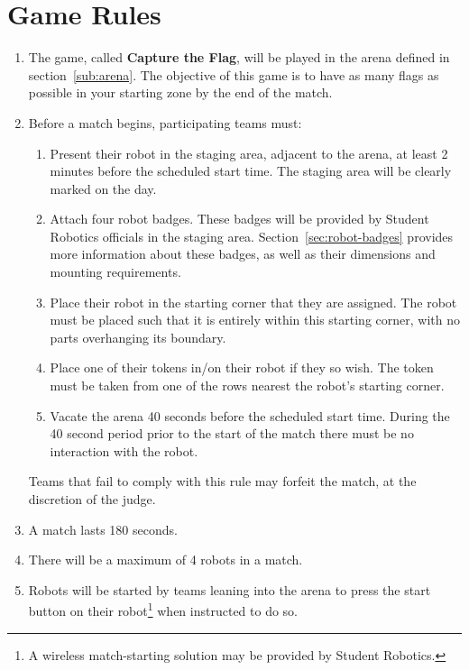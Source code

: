 \section {Game Rules}
\label{game-rules}

\begin{enumerate}
\item The game, called \textbf{Capture the Flag}, will be played in the arena defined in section~\ref{sub:arena}.
      The objective of this game is to have as many flags as possible in your starting zone by the end of the match.

\item Before a match begins, participating teams must:
\begin {enumerate}
  \item Present their robot in the staging area, adjacent to the arena, at least 2 minutes before the scheduled start time.
        The staging area will be clearly marked on the day.

  \item Attach four robot badges.
        These badges will be provided by Student Robotics officials in the staging area.
        Section~\ref{sec:robot-badges} provides more information about these badges, as well as their dimensions and mounting requirements.

  \item Place their robot in the starting corner that they are assigned.
        The robot must be placed such that it is entirely within this starting corner, with no parts overhanging its boundary.

  \item Place one of their tokens in/on their robot if they so wish.
        The token must be taken from one of the rows nearest the robot's starting corner.

  \item Vacate the arena 40 seconds before the scheduled start time.
        During the 40 second period prior to the start of the match there must be no interaction with the robot.
\end{enumerate}
  Teams that fail to comply with this rule may forfeit the match, at the discretion of the judge.

\item A match lasts 180 seconds.

\item There will be a maximum of 4 robots in a match.

\item Robots will be started by teams leaning into the arena to press the start button on their robot\footnote{A wireless match-starting solution may be provided by Student Robotics.} when instructed to do so.


\end{enumerate}
